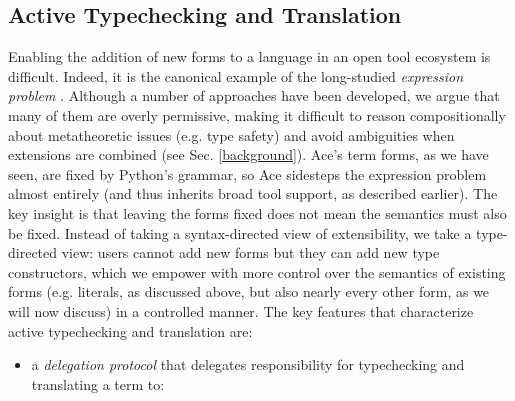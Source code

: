 {\subsection{Active Typechecking and Translation}\label{ace-att}


Enabling the addition of new forms to a language in an open tool ecosystem is difficult. Indeed, it is the canonical example of the long-studied \emph{expression problem} \cite{wadler1998expression}. Although a number of approaches have been developed, we argue that many of them are overly permissive, making it difficult to reason compositionally about metatheoretic issues (e.g. type safety) and avoid ambiguities when extensions are combined (see Sec. \ref{background}). %
Ace's term forms, as we have seen, are fixed by Python's grammar, so Ace sidesteps the expression problem almost entirely (and thus inherits broad tool support, as described earlier). The key insight is that leaving the forms fixed does not mean the semantics must also be fixed. Instead of taking a syntax-directed view of extensibility, we take a type-directed view: users cannot add new forms but they can add new type constructors, which we empower with  more control over the semantics of existing forms (e.g. literals, as discussed above, but also nearly every other form, as we will now discuss) in a controlled manner.  %
The key features that characterize active typechecking and translation are: \begin{itemize}
\item a \emph{delegation protocol} that delegates responsibility for typechecking and translating a term to:
  \begin{itemize}

\end{itemize}
\end{itemize}}
